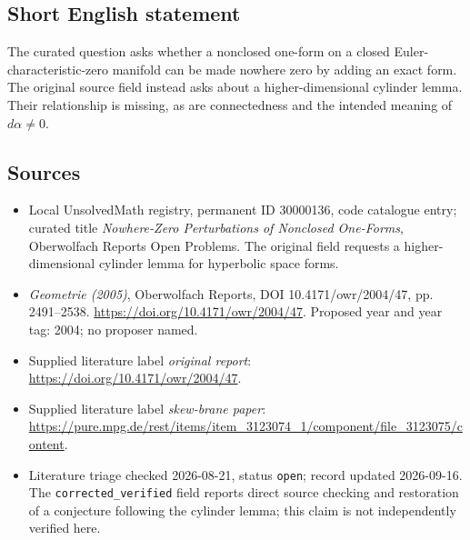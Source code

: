 \documentclass[11pt]{article}
\begin{document}
\subsection{Short English statement}
The curated question asks whether a nonclosed one-form on a closed Euler-characteristic-zero manifold can be made nowhere zero by adding an exact form. The original source field instead asks about a higher-dimensional cylinder lemma. Their relationship is missing, as are connectedness and the intended meaning of \(d\alpha\ne0\).
\subsection{Sources}
\begin{itemize}\item Local UnsolvedMath registry, permanent ID 30000136, code catalogue entry; curated title \emph{Nowhere-Zero Perturbations of Nonclosed One-Forms}, Oberwolfach Reports Open Problems. The original field requests a higher-dimensional cylinder lemma for hyperbolic space forms.\item \emph{Geometrie (2005)}, Oberwolfach Reports, DOI 10.4171/owr/2004/47, pp. 2491--2538. \url{https://doi.org/10.4171/owr/2004/47}. Proposed year and year tag: 2004; no proposer named.\item Supplied literature label \emph{original report}: \url{https://doi.org/10.4171/owr/2004/47}.\item Supplied literature label \emph{skew-brane paper}: \url{https://pure.mpg.de/rest/items/item_3123074_1/component/file_3123075/content}.\item Literature triage checked 2026-08-21, status \texttt{open}; record updated 2026-09-16. The \texttt{corrected\_verified} field reports direct source checking and restoration of a conjecture following the cylinder lemma; this claim is not independently verified here.\end{itemize}
\end{document}
